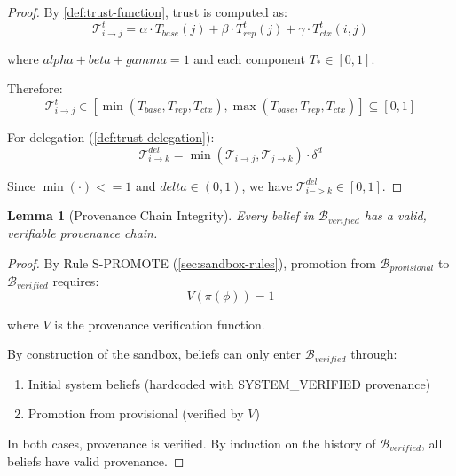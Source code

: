 \documentclass[
]{article}
\newtheorem{lemma}[theorem]{Lemma}
\begin{document}
\begin{proof}
By \cref{def:trust-function}, trust is computed as:
\begin{equation}
\label{eq:trust-computation}
\mathcal{T}_{i \to j}^t = \alpha \cdot T_{base}(j) + \beta \cdot T_{rep}^t(j) + \gamma \cdot T_{ctx}^t(i,j)
\end{equation}

where $alpha + beta + gamma = 1$ and each component $T_* \in [0, 1]$.

Therefore:
\begin{equation}
\label{eq:trust-range}
\mathcal{T}_{i \to j}^t \in [\min(T_{base}, T_{rep}, T_{ctx}), \max(T_{base}, T_{rep}, T_{ctx})] \subseteq [0, 1]
\end{equation}

For delegation (\cref{def:trust-delegation}):
\begin{equation}
\label{eq:delegation-range}
\mathcal{T}_{i \to k}^{del} = \min(\mathcal{T}_{i \to j}, \mathcal{T}_{j \to k}) \cdot \delta^d
\end{equation}

Since $\min(\cdot) <= 1$ and $delta \in (0, 1)$, we have $\mathcal{T}_{i -> k}^{del} \in [0, 1]$.
\end{proof}

\begin{lemma}[Provenance Chain Integrity]
\label{lem:provenance-integrity}
Every belief in $\mathcal{B}_{verified}$ has a valid, verifiable provenance chain.
\end{lemma}

\begin{proof}
By Rule S-PROMOTE (\cref{sec:sandbox-rules}), promotion from $\mathcal{B}_{provisional}$ to $\mathcal{B}_{verified}$ requires:
\begin{equation}
\label{eq:provenance-verification}
V(\pi(\phi)) = 1
\end{equation}

where $V$ is the provenance verification function.

By construction of the sandbox, beliefs can only enter $\mathcal{B}_{verified}$ through:
\begin{enumerate}
\item Initial system beliefs (hardcoded with SYSTEM\_VERIFIED provenance)
\item Promotion from provisional (verified by $V$)
\end{enumerate}

In both cases, provenance is verified. By induction on the history of $\mathcal{B}_{verified}$, all beliefs have valid provenance.
\end{proof}
\end{document}
